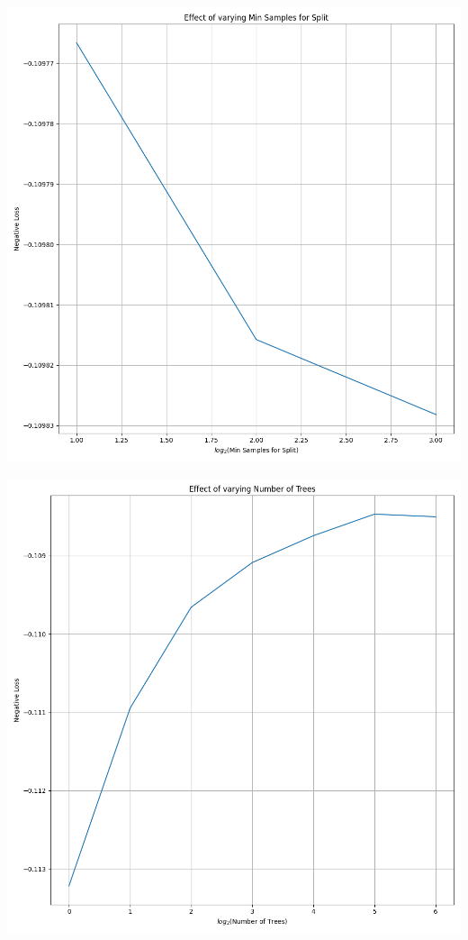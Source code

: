 \documentclass[12pt, letterpaper]{article}
\begin{document}
\includegraphics[scale=\myscale]{random_forest_regressor_Min Samples for Split.png}

\includegraphics[scale=\myscale]{random_forest_regressor_Number of Trees.png}
\end{document}
